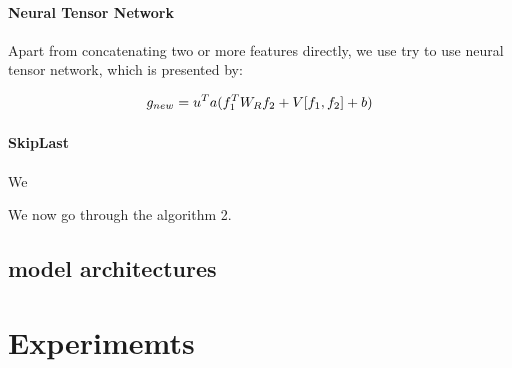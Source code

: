 \documentclass[sigconf]{acmart}
\begin{document}
\paragraph{Neural Tensor Network}
Apart from concatenating two or more features directly, we use try to use neural tensor network,
which is presented by:

\begin{equation}
  g_{new} = u^{T} a(f_{1}^{T} W_{R} f_{2} + V [ f_{1}, f_{2} ] + b) \\ 
\end{equation}




\paragraph{SkipLast}We

We now go through the algorithm 2.




\subsection{model architectures}


\section{Experimemts}
\end{document}
